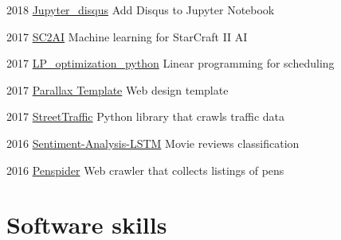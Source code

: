 \documentclass{tccv}
\begin{document}
\begin{yearlist}

\item{2018}
     {\href{https://github.com/vwxyzjn/jupyter_disqus}{Jupyter\_disqus}}
     {Add Disqus to Jupyter Notebook}

\item{2017}
     {\href{https://costahuang.me/SC2AI/}{SC2AI}}
     {Machine learning for StarCraft II AI}

\item{2017}
     {\href{https://costahuang.me/LP_optimization_python/}{LP\_optimization\_python}}
     {Linear programming for scheduling}

\item{2017}
     {\href{https://vuetifyjs.com/themes/parallax-starter/}{Parallax Template}}
     {Web design template}

\item{2017}
     {\href{https://streettraffic.org/}{StreetTraffic}}
     {Python library that crawls traffic data}

\item{2016}
     {\href{https://costahuang.me/Sentiment-Analysis-LSTM/}{Sentiment-Analysis-LSTM}}
     {Movie reviews classification}

\item{2016}
     {\href{https://github.com/vwxyzjn/penspider}{Penspider}}
     {Web crawler that collects listings of pens }

\end{yearlist}



\section{Software skills}
\end{document}
